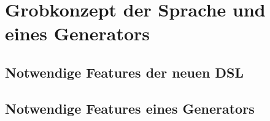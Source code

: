 \chapter{Grobkonzept der Sprache und eines Generators}\label{Grobkonzept der
Sprache und eines Generators}
\section{Notwendige Features der neuen DSL}
\section{Notwendige Features eines Generators}